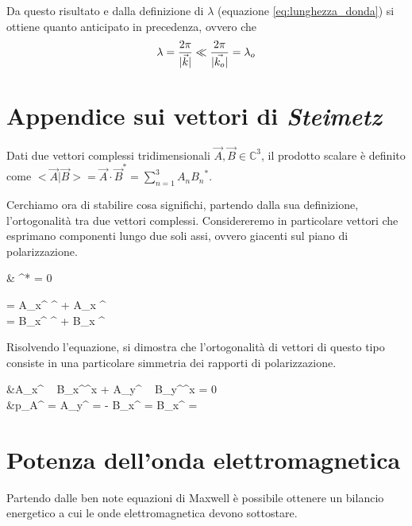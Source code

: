 		Da questo risultato e dalla definizione di $\lambda$ (equazione \ref{eq:lunghezza_donda}) si ottiene quanto anticipato in precedenza, ovvero che
		\begin{equation*} \begin{split}
			& \lambda = \frac{2\pi}{|\vec{k}|} \ll \frac{2\pi}{|\vec{k_o}|} = \lambda_o \\
		\end{split} \end{equation*}

\section{Appendice sui vettori di \emph{Steimetz}}
	Dati due vettori complessi tridimensionali $\vec{A}, \vec{B} \in \mathbb{C}^3$, il prodotto scalare è definito come $<\vec{A} | \vec{B}> = \vec{A} \cdot \vec{B}^* = \sum_{n=1}^3 A_n {B_n}^*$.

	Cerchiamo ora di stabilire cosa significhi, partendo dalla sua definizione,  l'ortogonalità tra due vettori complessi. Considereremo in particolare vettori che esprimano componenti lungo due soli assi, ovvero giacenti sul piano di polarizzazione.

	\begin{esp}
		&  \perp {} \Leftrightarrow {} \cdot {}^* = 0 \quad {}\quad \begin{dcases}
			 = A_{x^{\prime}} ^{\prime} + A_x ^{\prime} \\
			 = B_{x^{\prime}} ^{\prime} + B_x ^{\prime}
		\end{dcases}
	\end{esp}

	Risolvendo l'equazione, si dimostra che l'ortogonalità di vettori di questo tipo consiste in una particolare simmetria dei rapporti di polarizzazione.
	\begin{esp}
		&A_{x^{\prime}} ~ B_{x^{\prime}}^x + A_{y^{\prime}} ~ B_{y^{\prime}}^x = 0 \\
		&p_A^{\prime} = \jmath {} { A_{y^{\prime}} }
			= - \jmath {} { B_{x^{\prime}} }
			=  {\jmath {} { B_{x^{\prime}} }} = \frac{1}{-p_B^{* \prime}}
	\end{esp}

\section{Potenza dell'onda elettromagnetica}
	Partendo dalle ben note equazioni di Maxwell è possibile ottenere un bilancio energetico a cui le onde elettromagnetica devono sottostare.

